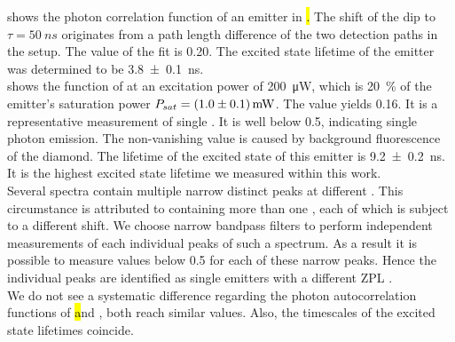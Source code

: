 		 shows the photon correlation function of an emitter in \hl. 
		The shift of the dip to $\tau=\SI{50}{ns}$ originates from a path length difference of the two detection paths in the \HBT setup.
		The \gtz value of the fit is \num{0.20}.
		The excited state lifetime of the emitter was determined to be \SI[separate-uncertainty]{3.8\pm0.1}{ns}.
		\\
		 shows the \gt function of \embroad at an excitation power of \SI{200}{\micro\W}, which is \SI{20}{\percent} of the emitter's saturation power $P_{sat}=\SI[separate-uncertainty]{1.0\pm0.1}{mW}$.
		The \gtz value yields \num{0.16}.
		It is a representative \gt measurement of single \sivs.
		It is well below \num{0.5}, indicating single photon emission.
		The non-vanishing \gtz value is caused by background fluorescence of the diamond.
		The lifetime of the excited state of this emitter is \SI[separate-uncertainty]{9.2\pm0.2}{ns}.
		It is the highest excited state lifetime we measured within this work.
		\\
		Several \nd \pl spectra contain multiple narrow distinct peaks at different \wls.
		This circumstance is attributed to \nds containing more than one \siv, each of which is subject to a different \ZPL \wl shift.
		We choose narrow bandpass filters to perform independent measurements of each individual peaks of such a spectrum.
		As a result it is possible to measure \gtz values below \num{0.5} for each of these narrow peaks.
		Hence the individual peaks are identified as single emitters with a different ZPL \cwl.
		\\
		We do not see a systematic difference regarding the photon autocorrelation functions of \hl and \vl, both reach similar \gtz values.
		Also, the timescales of the excited state lifetimes coincide.
